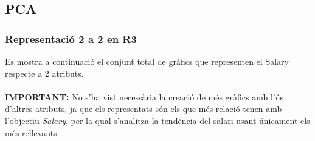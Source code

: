 \documentclass[a4paper, 11pt]{article}
\begin{document}
\begin{figure}[h]
\captionsetup[subfigure]{labelformat=empty}
\centering
\end{figure}
\begin{figure}[h]
\captionsetup[subfigure]{labelformat=empty}
\centering
{}
\end{figure}
\newpage

\subsection{PCA} \label{PCA}
\subsubsection{Representació 2 a 2 en R3}
Es mostra a continuació el conjunt total de gràfics que representen el Salary respecte a 2 atributs.\\\\
\textbf{IMPORTANT:} No s'ha vist necessària la creació de més gràfics amb l'ús d'altres atributs, ja que els representats són els que més relació tenen amb l'objectiu \textit{Salary}, per la qual s'analitza la tendència del salari usant únicament els més rellevants.
\end{document}
